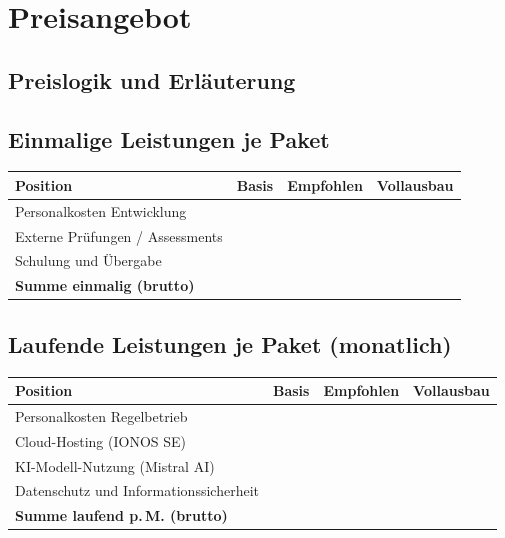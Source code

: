 \chapter{Preisangebot}

\section{Preislogik und Erläuterung}


\section{Einmalige Leistungen je Paket}

\begin{tabularx}{\textwidth}{@{} X r r r @{}}
  \toprule
  \textbf{Position}
    & \textbf{Basis}
    & \textbf{Empfohlen}
    & \textbf{Vollausbau} \\
  \midrule
  Personalkosten Entwicklung        & \ph{€} & \ph{€} & \ph{€} \\
  Externe Prüfungen / Assessments   & \ph{€} & \ph{€} & \ph{€} \\
  Schulung und Übergabe             & \ph{€} & \ph{€} & \ph{€} \\
  \midrule
  \textbf{Summe einmalig (brutto)}  & \textbf{\ph{€}} & \textbf{\ph{€}} & \textbf{\ph{€}} \\
  \bottomrule
\end{tabularx}

\section{Laufende Leistungen je Paket (monatlich)}

\begin{tabularx}{\textwidth}{@{} X r r r @{}}
  \toprule
  \textbf{Position}
    & \textbf{Basis}
    & \textbf{Empfohlen}
    & \textbf{Vollausbau} \\
  \midrule
  Personalkosten Regelbetrieb               & \ph{€} & \ph{€} & \ph{€} \\
  Cloud-Hosting (IONOS SE)                  & \ph{€} & \ph{€} & \ph{€} \\
  KI-Modell-Nutzung (Mistral AI)            & \ph{€} & \ph{€} & \ph{€} \\
  Datenschutz und Informationssicherheit    & \ph{€} & \ph{€} & \ph{€} \\
  \midrule
  \textbf{Summe laufend p.\,M. (brutto)}   & \textbf{\ph{€}} & \textbf{\ph{€}} & \textbf{\ph{€}} \\
  \bottomrule
\end{tabularx}

